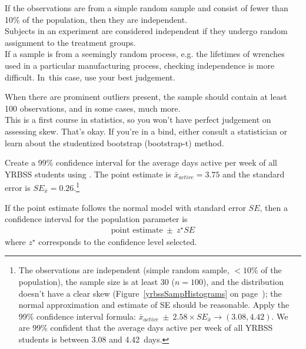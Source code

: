 \begin{tipBox}{
If the observations are from a simple random sample and consist of fewer than 10\% of the population, then they are independent.\\[2mm]
Subjects in an experiment are considered independent if they undergo random assignment to the treatment groups. \\[2mm]
If a sample is from a seemingly random process, e.g. the lifetimes of wrenches used in a particular manufacturing process, checking independence is more difficult. In~this case, use your best judgement.}
\end{tipBox}

\begin{tipBox}{
When there are prominent outliers present, the sample should contain at least 100 observations, and in some cases, much more. \\[2mm]
This is a first course in statistics, so you won't have perfect judgement on assessing skew. That's okay. If you're in a bind, either consult a statistician or learn about the studentized bootstrap (bootstrap-t) method.}
\end{tipBox}

\begin{exercise} \label{find99CIForYrbssAgeExercise}
Create a 99\% confidence interval for the average days active per week of all YRBSS students using . The point estimate is $\bar{x}_{active} = 3.75$ and the standard error is $SE_{\bar{x}} = 0.26$.\footnote{The observations are independent (simple random sample, $<10\%$ of the population), the sample size is at least 30 ($n = 100$), and the distribution doesn't have a clear skew (Figure~\ref{yrbssSampHistograms} on page~\pageref{yrbssSampHistograms}); the normal approximation and estimate of SE should be reasonable. Apply the 99\% confidence interval formula: $\bar{x}_{active}\ \pm\ 2.58 \times  SE_{\bar{x}} \rightarrow (3.08, 4.42)$. We are 99\% confident that the average days active per week of all YRBSS students is between 3.08 and 4.42~days.}
\end{exercise}

\begin{termBox}{
If the point estimate follows the normal model with standard error $SE$, then a confidence interval for the population parameter is
\begin{eqnarray*}
\text{point estimate}\ \pm\ z^{\star} SE
\end{eqnarray*}
where $z^{\star}$ corresponds to the confidence level selected.}
\end{termBox}

